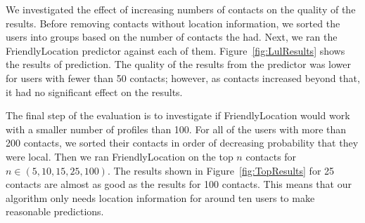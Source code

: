 We investigated the effect of increasing numbers of contacts on the quality of
the results.
Before removing contacts without location information, we sorted the users into
groups based on the number of contacts the had.
Next, we ran the FriendlyLocation predictor against each of them.
Figure~\ref{fig:LulResults} shows the results of prediction.
The quality of the results from the predictor was lower for users with fewer
than 50 contacts; however, as contacts increased beyond that, it had no
significant effect on the results.


The final step of the evaluation is to investigate if FriendlyLocation would
work with a smaller number of profiles than 100.
For all of the users with more than 200 contacts, we sorted their contacts in
order of decreasing probability that they were local.
Then we ran FriendlyLocation on the top \(n\) contacts for
\(n\in (5,10,15,25,100)\).
The results shown in Figure~\ref{fig:TopResults} for 25 contacts are almost as
good as the results for 100 contacts. This means that our algorithm only needs
location information for around ten users to make reasonable predictions.


